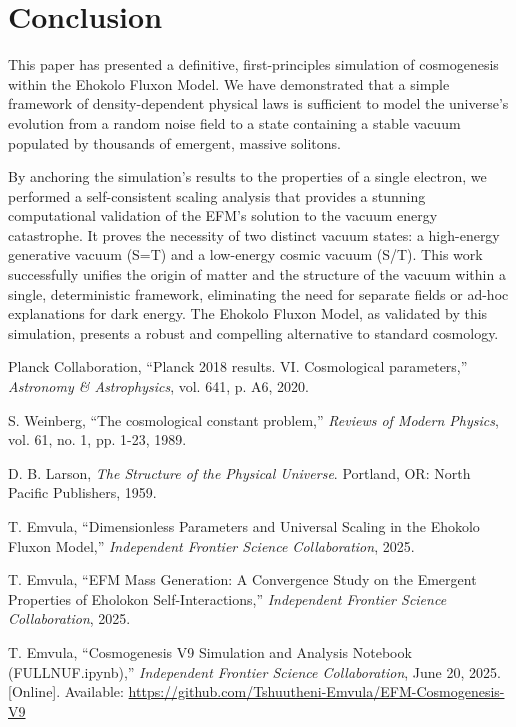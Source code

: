 \documentclass[11pt, twoside]{article}
\begin{document}
\section{Conclusion}
This paper has presented a definitive, first-principles simulation of cosmogenesis within the Ehokolo Fluxon Model. We have demonstrated that a simple framework of density-dependent physical laws is sufficient to model the universe's evolution from a random noise field to a state containing a stable vacuum populated by thousands of emergent, massive solitons.

By anchoring the simulation's results to the properties of a single electron, we performed a self-consistent scaling analysis that provides a stunning computational validation of the EFM's solution to the vacuum energy catastrophe. It proves the necessity of two distinct vacuum states: a high-energy generative vacuum (S=T) and a low-energy cosmic vacuum (S/T). This work successfully unifies the origin of matter and the structure of the vacuum within a single, deterministic framework, eliminating the need for separate fields or ad-hoc explanations for dark energy. The Ehokolo Fluxon Model, as validated by this simulation, presents a robust and compelling alternative to standard cosmology.


\begin{thebibliography}{9}
\raggedright

Planck Collaboration, ``Planck 2018 results. VI. Cosmological parameters,'' \textit{Astronomy \& Astrophysics}, vol. 641, p. A6, 2020.

S. Weinberg, ``The cosmological constant problem,'' \textit{Reviews of Modern Physics}, vol. 61, no. 1, pp. 1-23, 1989.

D. B. Larson, \textit{The Structure of the Physical Universe}. Portland, OR: North Pacific Publishers, 1959.

T. Emvula, ``Dimensionless Parameters and Universal Scaling in the Ehokolo Fluxon Model,'' \textit{Independent Frontier Science Collaboration}, 2025.

T. Emvula, ``EFM Mass Generation: A Convergence Study on the Emergent Properties of Eholokon Self-Interactions,'' \textit{Independent Frontier Science Collaboration}, 2025.

T. Emvula, ``Cosmogenesis V9 Simulation and Analysis Notebook (FULLNUF.ipynb),'' \textit{Independent Frontier Science Collaboration}, June 20, 2025. [Online]. Available: \url{https://github.com/Tshuutheni-Emvula/EFM-Cosmogenesis-V9}

\end{thebibliography}
\end{document}
